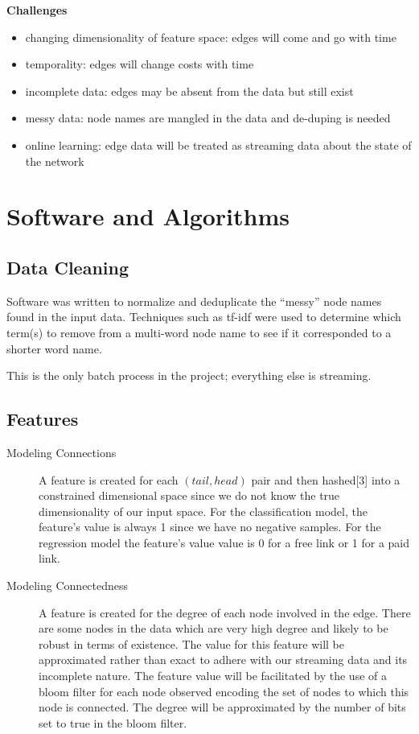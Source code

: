 \documentclass{article} %
\begin{document}
\textbf{Challenges}
\begin{itemize}
\item changing dimensionality of feature space: edges will come and go with time
\item temporality: edges will change costs with time
\item incomplete data: edges may be absent from the data but still exist
\item messy data: node names are mangled in the data and de-duping is needed
\item online learning: edge data will be treated as streaming data about the state of the network
\end{itemize}

\section{Software and Algorithms}

\subsection{Data Cleaning}
Software was written to normalize and deduplicate the ``messy'' node names
found in the input data.  Techniques such as tf-idf were used to determine
which term(s) to remove from a multi-word node name to see if it
corresponded to a shorter word name.

This is the only batch process in the project; everything else is streaming.

\subsection{Features}

\begin{description}
\item [Modeling Connections] A feature is created for each $(tail,head)$ pair and then hashed[3] into a
constrained dimensional space since we do not know the true dimensionality
of our input space.  For the classification model, the feature's value is always 1
since we have no negative samples.  For the regression model the feature's value value is 0
for a free link or 1 for a paid link.
\item [Modeling Connectedness] A feature is created for the degree of each node
  involved in the edge.  There are some nodes in
  the data which are very high degree and likely to be robust in terms of
  existence.  The value for this feature will be approximated rather than
  exact to adhere with our streaming data and its incomplete nature.  The feature value will be facilitated by the use of a
  bloom filter for each node observed encoding the set of nodes to which
  this node is connected.  The degree will be approximated by the
  number of bits set to true in the bloom filter.  
\end{description}
\end{document}

